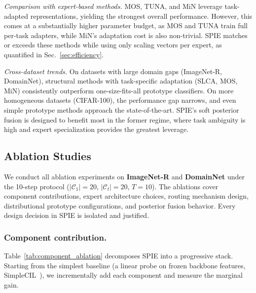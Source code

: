 \textit{Comparison with expert-based methods.} MOS, TUNA, and MiN leverage task-adapted representations, yielding the strongest overall performance. However, this comes at a substantially higher parameter budget, as MOS and TUNA train full per-task adapters, while MiN's adaptation cost is also non-trivial. SPIE matches or exceeds these methods while using only scaling vectors per expert, as quantified in Sec.~\ref{sec:efficiency}.

\textit{Cross-dataset trends.} On datasets with large domain gaps (ImageNet-R, DomainNet), structural methods with task-specific adaptation (SLCA, MOS, MiN) consistently outperform one-size-fits-all prototype classifiers. On more homogeneous datasets (CIFAR-100), the performance gap narrows, and even simple prototype methods approach the state-of-the-art. SPIE's soft posterior fusion is designed to benefit most in the former regime, where task ambiguity is high and expert specialization provides the greatest leverage.

\subsection{Ablation Studies}
\label{sec:ablation}

We conduct all ablation experiments on \textbf{ImageNet-R} and \textbf{DomainNet} under the 10-step protocol ($|\mathcal{C}_1|=20$, $|\mathcal{C}_t|=20$, $T=10$). The ablations cover component contributions, expert architecture choices, routing mechanism design, distributional prototype configurations, and posterior fusion behavior. Every design decision in SPIE is isolated and justified.

\subsubsection{Component contribution.}

Table~\ref{tab:component_ablation} decomposes SPIE into a progressive stack. Starting from the simplest baseline (a linear probe on frozen backbone features, SimpleCIL~\cite{zhou2025revisiting}), we incrementally add each component and measure the marginal gain.

